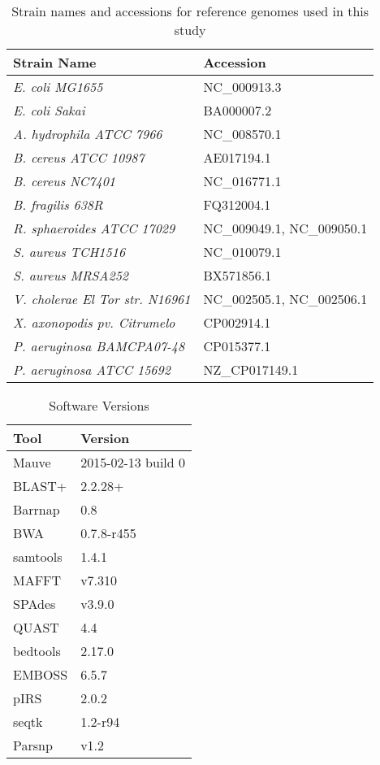 \documentclass[10pt]{article}
\begin{document}
\begin{table}[]
\centering
\caption{Strain names and accessions for reference genomes used in this study}
\label{table:strainlist}
\begin{tabular}{ll}
  \toprule
  Strain Name & Accession \\
  \midrule
  \textit{E. coli MG1655} & NC\_000913.3 \\
  \textit{E. coli Sakai} &  BA000007.2 \\
  \textit{A. hydrophila ATCC 7966} & NC\_008570.1 \\
  \textit{B. cereus ATCC 10987} & AE017194.1 \\
  \textit{B. cereus NC7401} & NC\_016771.1 \\
  \textit{B. fragilis 638R} & FQ312004.1 \\
  \textit{R. sphaeroides ATCC 17029} & NC\_009049.1, NC\_009050.1 \\
  \textit{S. aureus TCH1516} & NC\_010079.1 \\
  \textit{S. aureus MRSA252} & BX571856.1 \\
  \textit{V. cholerae El Tor str. N16961} & NC\_002505.1, NC\_002506.1 \\
  \textit{X. axonopodis pv. Citrumelo} & CP002914.1 \\
  \textit{P. aeruginosa BAMCPA07-48} & CP015377.1 \\
  \textit{P. aeruginosa ATCC 15692} & NZ\_CP017149.1\\
  \bottomrule

\end{tabular}
\end{table}

\begin{table}[]
  \centering
  \caption{Software Versions}
  \label{table:software}
  \begin{tabular}{ll}
    \toprule
    Tool & Version \\
    \midrule
    Mauve & 2015-02-13 build 0 \\
    BLAST+ & 2.2.28+ \\
    Barrnap & 0.8 \\
    BWA & 0.7.8-r455 \\
    samtools & 1.4.1 \\
    MAFFT & v7.310 \\
    SPAdes & v3.9.0 \\
    QUAST & 4.4 \\
    bedtools & 2.17.0 \\
    EMBOSS & 6.5.7 \\
    pIRS & 2.0.2\\
    seqtk & 1.2-r94\\
    Parsnp & v1.2 \\
    \bottomrule
  \end{tabular}
\end{table}
\end{document}
